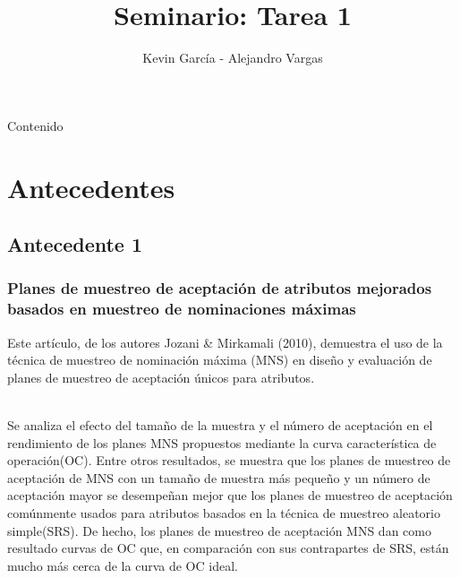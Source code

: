 \documentclass[10pt]{beamer}
\author{Kevin García - Alejandro Vargas}
\title{Seminario: Tarea 1}
\begin{document}
\begin{frame}[plain]
\maketitle
\end{frame}

\begin{frame}{Contenido}
\tableofcontents
\end{frame}

\section{Antecedentes}
\subsection{Antecedente 1}
\begin{frame}
\frametitle{Planes de muestreo de aceptación de atributos mejorados basados en muestreo de nominaciones máximas}
Este artículo, de los autores Jozani \& Mirkamali (2010), demuestra el uso de la técnica de muestreo de nominación máxima (MNS) en diseño y evaluación de planes de muestreo de aceptación únicos para atributos.


~\\Se analiza el efecto del tamaño de la muestra y el número de aceptación en el rendimiento de los planes MNS propuestos mediante la curva característica de operación(OC). Entre otros resultados, se muestra que los planes de muestreo de aceptación de MNS con un tamaño de muestra más pequeño y un número de aceptación mayor se desempeñan mejor que los planes de muestreo de aceptación comúnmente usados para atributos basados en la técnica de muestreo aleatorio simple(SRS). De hecho, los planes de muestreo de aceptación MNS dan como resultado curvas de OC que, en comparación con sus contrapartes de SRS, están mucho más cerca de la curva de OC ideal.  
\end{frame}
\end{document}

